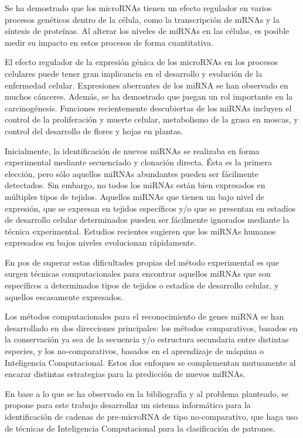 \documentclass[bibliography=openstyle,DIV=12]{scrartcl}
\begin{document}
Se ha demostrado que los microRNAs tienen un efecto regulador en varios procesos genéticos dentro de la célula, como la transcripción de mRNAs y la síntesis de proteínas. Al alterar los niveles de miRNAs en las células, es posible medir su impacto en estos procesos de forma cuantitativa. \cite{LI}

El efecto regulador de la expresión génica de los microRNAs en los procesos celulares puede tener gran implicancia en el desarrollo y evolución de la enfermedad celular. Expresiones aberrantes de los miRNA se han observado en muchos cánceres. Además, se ha demostrado que juegan un rol importante en la carcinogénesis. \cite{Li 2010} Funciones recientemente descubiertas de los miRNAs incluyen el control de la proliferación y muerte celular, metabolismo de la grasa en moscas, y control del desarrollo de flores y hojas en plantas. \cite{BARTEL CELL 116}

Inicialmente, la identificación de nuevos miRNAs se realizaba en forma experimental mediante secuenciado y clonación directa. Ésta es la primera elección, pero sólo aquellos miRNAs abundantes pueden ser fácilmente detectados. Sin embargo, no todos los miRNAs están bien expresados en múltiples tipos de tejidos. Aquellos miRNAs que tienen un bajo nivel de expresión, que se expresan en tejidos específicos y/o que se presentan en estadíos de desarrollo celular determinados pueden ser fácilmente ignorados mediante la técnica experimental. Estudios recientes sugieren que los miRNAs humanos expresados en bajos niveles evolucionan rápidamente. \cite{DING+XU}

En pos de superar estas dificultades propias del método experimental es que surgen técnicas computacionales para encontrar aquellos miRNAs que son específicos a determinados tipos de tejidos o estadíos de desarrollo celular, y aquellos escasamente expresados. \cite{SHENG+XU}

Los métodos computacionales para el reconocimiento de genes miRNA se han desarrollado en dos direcciones principales: los métodos comparativos, basados en la conservación ya sea de la secuencia y/o estructura secundaria entre distintas especies, y los no-comparativos, basados en el aprendizaje de máquina o Inteligencia Computacional. Estos dos enfoques se complementan mutuamente al encarar distintas estrategias para la predicción de nuevos miRNAs. \cite{BATUWITA+SHENG}

En base a lo que se ha observado en la bibliografía y al problema planteado, se propone para este trabajo desarrollar un sistema informático para la identificación de cadenas de pre-microRNA de tipo no-comparativo, que haga uso de técnicas de Inteligencia Computacional para la clasificación de patrones.
\end{document}
